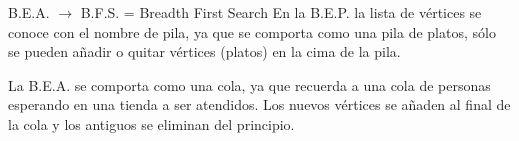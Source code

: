 \documentclass[twoside]{report}
\newcommand{\bs}[1]{\boldsymbol{#1}}
\begin{document}
\vspace{0.4cm}
        B.E.A. $\rightarrow$ B.F.S. = Breadth First Search
\vspace{0.4cm}
%
%
%
        En la B.E.P. la lista de v\'{e}rtices se conoce con el nombre de pila, ya que se comporta como una pila de platos,
        s\'{o}lo se pueden a\~{n}adir o quitar v\'{e}rtices (platos) en la cima de la pila.
\vspace{0.2cm}

        La B.E.A. se comporta como una cola, ya que recuerda a una cola de personas esperando en una tienda a ser atendidos. Los nuevos
        v\'{e}rtices se a\~{n}aden al final de la cola y los antiguos se eliminan del principio.
\vspace{0.2cm}
\end{document}
